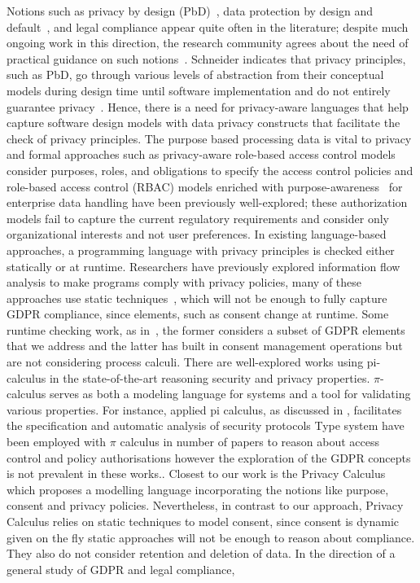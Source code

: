 Notions such as privacy by design (PbD)~\cite{CavoukianC09}, data protection by design and default~\cite{EUA2014}, and legal compliance appear quite often in the literature; despite much ongoing work in this direction, the research community agrees about the need of practical guidance on such notions~\cite{utz__2019, kutylowski_gdpr_2020 }. Schneider indicates that privacy principles, such as PbD, go through various levels of abstraction from their conceptual models during design time until software implementation and do not entirely guarantee privacy~\cite{schneider_is_2018}. Hence, there is a need for privacy-aware languages that help capture software design models with data privacy constructs that facilitate the check of privacy principles.
The purpose based processing data is vital to privacy and formal approaches such as 
privacy-aware role-based access control models consider purposes, roles, and obligations to specify the access control policies and role-based access control (RBAC) models enriched with purpose-awareness~\cite{yang_purpose-based_2007,byun_purpose_2005,masoumzadeh_purbac_2008 } for enterprise data handling have been previously well-explored; these authorization models fail to capture the current regulatory requirements and consider only organizational interests and not user preferences.
%
In existing language-based approaches, a programming language with privacy principles is checked either statically or at runtime. Researchers have previously explored information flow analysis to make  programs comply with  privacy policies, many of these
approaches use static techniques~\cite{TokasOR22, sen_bootstrapping_2014, myers_protecting_2000}, which will not be enough to fully capture %
GDPR compliance, since elements, such as consent change at runtime. 
Some runtime checking work, as in~\cite{TokasO20, KaramiBJ22}, the former considers a subset of GDPR elements that we address and the latter has built in consent management operations but are not considering process calculi.
%
There are well-explored works using pi-calculus in the state-of-the-art reasoning security and privacy properties. $\pi$-calculus serves as both a modeling language for systems and a tool for validating various properties. For instance, applied pi calculus, as discussed in \cite{abadi2017applied}, facilitates the specification and automatic analysis of security protocols Type system have been employed with $ \pi$ calculus in number of papers to reason about access control and policy authorisations however the exploration of the GDPR concepts is not prevalent in these works.. Closest to our work is the Privacy Calculus which proposes a modelling language incorporating the notions like purpose, consent and privacy policies. Nevertheless, in contrast to our approach, Privacy Calculus relies on static techniques to model consent, since consent is dynamic given on the fly static approaches will not be enough to reason about compliance.  They also do not consider retention and deletion of data. In the direction of a general study of GDPR and legal compliance,
